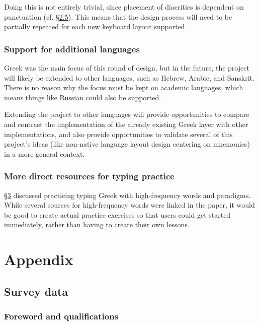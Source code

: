 \documentclass[11pt]{article}
\begin{document}
Doing this is not entirely trivial, since placement of diacritics is dependent on punctuation (cf. \hyperref[sec:orgf8a2889]{§2.5}). This means that the design process will need to be partially repeated for each new keyboard layout supported.

\subsubsection{Support for additional languages}
\label{sec:org52c1541}

Greek was the main focus of this round of design, but in the future, the project will likely be extended to other languages, such as Hebrew, Arabic, and Sanskrit. There is no reason why the focus must be kept on academic languages, which means things like Russian could also be supported.

Extending the project to other languages will provide opportunities to compare and contrast the implementation of the already existing Greek layer with other implementations, and also provide opportunities to validate several of this project's ideas (like non-native language layout design centering on mnemonics) in a more general context.

\subsubsection{More direct resources for typing practice}
\label{sec:orgca49e20}

\hyperref[sec:org762056f]{§3} discussed practicing typing Greek with high-frequency words and paradigms. While several sources for high-frequency words were linked in the paper, it would be good to create actual practice exercises so that users could get started immediately, rather than having to create their own lessons.

\section{Appendix}
\label{sec:org8d57903}

\subsection{Survey data}
\label{sec:orgf2463e8}

\subsubsection{Foreword and qualifications}
\label{sec:org35e41c1}
\end{document}
